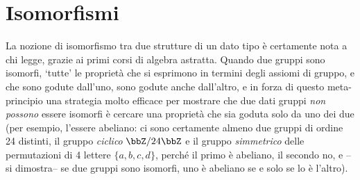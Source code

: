\section{Isomorfismi}\label{sec_isomorfismi}
La nozione di isomorfismo tra due strutture di un dato tipo è certamente nota a chi legge, grazie ai primi corsi di algebra astratta. Quando due gruppi sono isomorfi, `tutte' le proprietà che si esprimono in termini degli assiomi di gruppo, e che sono godute dall'uno, sono godute anche dall'altro, e in forza di questo meta-principio una strategia molto efficace per mostrare che due dati gruppi \emph{non possono} essere isomorfi è cercare una proprietà che sia goduta solo da uno dei due (per esempio, l'essere abeliano: ci sono certamente almeno due gruppi di ordine 24 distinti, il gruppo \emph{ciclico} \(\bbZ/24\bbZ\) e il gruppo \emph{simmetrico} delle permutazioni di 4 lettere \(\{a,b,c,d\}\), perché il primo è abeliano, il secondo no, e --si dimostra-- se due gruppi sono isomorfi, uno è abeliano se e solo se lo è l'altro).

